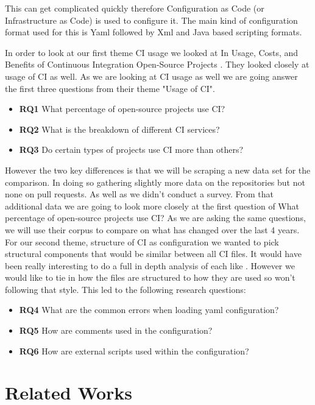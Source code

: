 \documentclass[twoside,12pt,titlepage,a4paper]{article}
\begin{document}
This can get complicated quickly therefore Configuration as Code (or Infrastructure as Code) is used to configure it. The main kind of configuration format used for this is Yaml followed by Xml and Java based scripting formats.


In order to look at our first theme CI usage we looked at In Usage, Costs, and Benefits of Continuous Integration Open-Source Projects \cite{Hilton2016}. They looked closely at usage of CI as well. As we are looking at CI usage as well we are going answer the first three questions from their theme "Usage of CI". 
\begin{itemize}
  \item \textbf{RQ1} What percentage of open-source projects use CI?
  \item \textbf{RQ2} What is the breakdown of different CI services?
  \item \textbf{RQ3} Do certain types of projects use CI more than others?
\end{itemize}

However the two key differences is that we will be scraping a new data set for the comparison. In doing so gathering slightly more data on the repositories but not none on pull requests. As well as we didn't conduct a survey. From that additional data we are going to look more closely at the first question of What percentage of open-source projects use CI?
As we are asking the same questions, we will use their corpus to compare on what has changed over the last 4 years. 
For our second theme, structure of CI as configuration we wanted to pick structural components that would be similar between all CI files. It would have been really interesting to do a full in depth analysis of each like \citet{Gallaba2018}. However we would like to tie in how the files are structured to how they are used so won't following that style. This led to the following research questions:
\begin{itemize}
  \item \textbf{RQ4} What are the common errors when loading yaml configuration?
  \item \textbf{RQ5} How are comments used in the configuration?
  \item \textbf{RQ6} How are external scripts used within the configuration?
\end{itemize}

\section{Related Works}
\vspace*{-0.05in}
\end{document}
